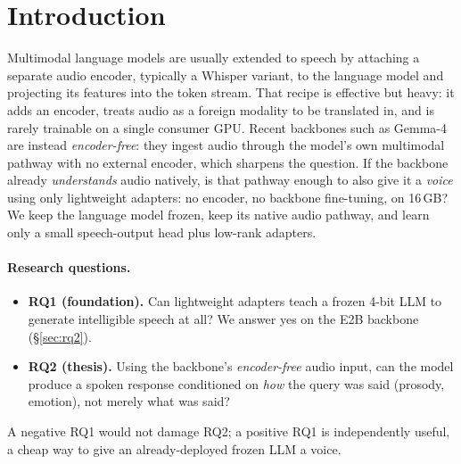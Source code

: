 \documentclass[11pt]{article}
\begin{document}
\section{Introduction}
\label{sec:intro}
Multimodal language models are usually extended to speech by attaching a separate
audio encoder, typically a Whisper variant, to the language model and projecting
its features into the token stream. That recipe is effective but heavy: it adds an
encoder, treats audio as a foreign modality to be translated in, and is rarely
trainable on a single consumer GPU. Recent backbones such as Gemma-4 are instead
\emph{encoder-free}: they ingest audio through the model's own multimodal pathway
with no external encoder, which sharpens the question. If the backbone already
\emph{understands} audio natively, is that pathway enough to also give it a
\emph{voice} using only lightweight adapters: no encoder, no backbone fine-tuning,
on 16\,GB? We keep the language model frozen, keep its native audio pathway, and
learn only a small speech-output head plus low-rank adapters.

\paragraph{Research questions.}
\begin{itemize}
  \item \textbf{RQ1 (foundation).} Can lightweight adapters teach a frozen 4-bit
        LLM to generate intelligible speech at all? We answer yes on the E2B
        backbone (\S\ref{sec:rq2}).
  \item \textbf{RQ2 (thesis).} Using the backbone's \emph{encoder-free} audio
        input, can the model produce a spoken response conditioned on \emph{how}
        the query was said (prosody, emotion), not merely what was said?
\end{itemize}
A negative RQ1 would not damage RQ2; a positive RQ1 is independently useful, a
cheap way to give an already-deployed frozen LLM a voice.
\end{document}
